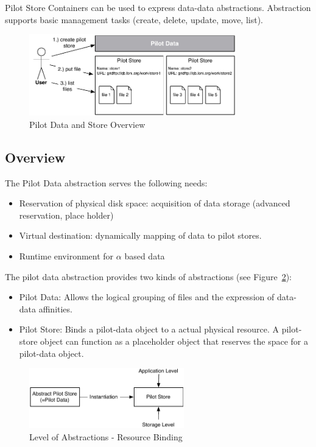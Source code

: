 \documentclass[]{article}
\begin{document}
Pilot Store Containers can be used to express data-data abstractions. 
Abstraction supports basic management tasks (create, delete, update,
move, list). 


\begin{figure}[htbp]
    \centering
        \includegraphics[width=0.8\textwidth]{figures/pilotstore.pdf}
    \caption{Pilot Data and Store Overview}
    \label{fig:figures_pilotstore}
\end{figure}



\subsection{Overview}

The Pilot Data abstraction serves the following needs:
\begin{itemize}
	\item Reservation of physical disk space: acquisition of data storage (advanced reservation, place holder)
	\item Virtual destination: dynamically mapping of data to pilot stores.
	\item Runtime environment for $\alpha$ based data
\end{itemize}

The pilot data abstraction provides two kinds of abstractions (see Figure~\ref{fig:figures_ps-instantiation}):
\begin{itemize}
    \item Pilot Data: Allows the logical grouping of files and the expression of data-data affinities.
    
    \item Pilot Store: Binds a pilot-data object to a actual physical resource. A pilot-store object can function as a placeholder object that reserves the space for a pilot-data object.
\end{itemize}


\begin{figure}[htbp]
    \centering
        \includegraphics[width=0.6\textwidth]{figures/ps-instantiation.pdf}
    \caption{Level of Abstractions - Resource Binding}
    \label{fig:figures_ps-instantiation}
\end{figure}
\end{document}
